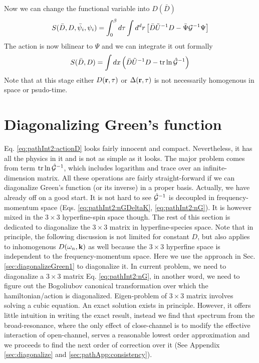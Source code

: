 Now we can change the functional variable into $D(\bar{D})$ 
\begin{equation}\label{eq:pathInt2:actionMixD}
S(\bar{D},D,\bar\psi_{i},\psi_{i})=\int^{\beta}_{0}d\tau\int{d^{d}r}
	\left[\bar{D}\tilde{U}^{-1}D-\bar\Psi\mathcal{G}^{-1}\Psi\right]
\end{equation}
The action is now bilinear to $\Psi$ and we can integrate it out formally
\begin{equation}\label{eq:pathInt2:actionD}
S(\bar{D},D)=\int{dx}\left(\bar{D}\tilde{U}^{-1}D-\text{tr}\ln\hat{\mathcal{G}}^{-1}\right)
\end{equation}
Note that at this stage either $D(\mathbf{r},\tau)$ or $\Delta(\mathbf{r},\tau)$ is not necessarily homogenous in space or psudo-time.  



\section{Diagonalizing Green's function\label{sec:diagonalGreen}}
Eq. \eqref{eq:pathInt2:actionD} looks fairly innocent and compact.  Nevertheless, it has all the physics in it and is not as simple as it looks.  The major problem comes from term $\text{tr}\ln\hat{\mathcal{G}}^{-1}$, which includes  logarithm and trace over an infinite-dimension matrix.   All these operations are fairly straight-forward if we can diagonalize  Green's function (or its inverse) in a proper basis.    Actually, we have already off on a good start.  It is not hard to see $\hat{\mathcal{G}}^{-1}$ is decoupled in frequency-momentum space (Eqs.  \ref{eq:pathInt2:nGDeltaK}, \ref{eq:pathInt2:nG}).  It is however mixed in the $3\times3$ hyperfine-spin space though.  The rest of this section is dedicated to diagonalize the $3\times3$ matrix in hyperfine-species space.  Note that in principle, the following discussion is not limited for constant $D$, but also applies to inhomogenous $D(\omega_{n},\mathbf{k})$ as well because the $3\times3$ hyperfine space is independent to the frequency-momentum space.   Here we use the approach in Sec. \ref{sec:diagonalizeGreen1} to diagonalize it.   
In current problem, we need to diagonalize a $3\times3$ matrix Eq. \ref{eq:pathInt2:nG}, in another word, we need to figure out the Bogoliubov canonical transformation over which the hamiltonian/action is diagonalized.   Eigen-problem of $3\times3$ matrix involves solving a cubic equation. An exact solution exists in principle.  However,  it offers little intuition in writing the exact result, instead we  find that  spectrum from the broad-resonance, where the only effect of close-channel is to modify the effective interaction of open-channel, serves a reasonable lowest order approximation and we proceeds to find the next order of correction over it (See Appendix \ref{sec:diagonalize} and \ref{sec:pathApp:consistency}). 


